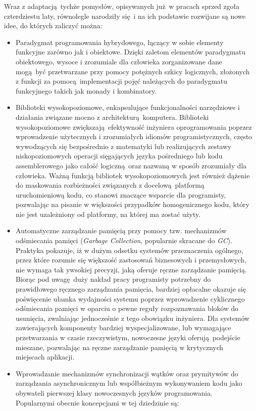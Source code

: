 \par{
Wraz z adaptacją tychże pomysłów, opisywanych już w pracach sprzed zgoła czterdziestu laty, równolegle narodziły się i na ich podstawie rozwijane są nowe idee, do których zaliczyć można:
\begin{itemize}
  \item Paradygmat programowania hybrydowego, łączący w sobie elementy funkcyjne zarówno jak i obiektowe. Dzięki zaletom elementów paradygmatu obiektowego, wysoce i zrozumiale dla człowieka zorganizowane dane mogą być przetwarzane przy pomocy potężnych szkicy logicznych, złożonych z funkcji za pomocą implementacji pojęć należących do paradygmatu funkcyjnego takich jak monady i kombinatory.
  \item Biblioteki wysokopoziomowe, enkapsulujące funkcjonalności narzędziowe i działania związane mocno z architekturą komputera. Biblioteki wysokopoziomowe zwiększają efektywność inżyniera oprogramowania poprzez wprowadzenie użytecznych i zrozumiałych idiomów programistycznych, często wywodzących się bezpośrednio z matematyki lub realizujących zestawy niskopoziomowych operacji sięgających języka pośredniego lub kodu assemblerowego jako całość logiczną oraz nazwaną w sposób zrozumiały dla człowieka. Ważną funkcją bibliotek wysokopoziomowych jest również dążenie do maskowania rozbieżności związanych z docelową platformą uruchomieniową kodu, co stanowi znaczące wsparcie dla programisty, pozwalając na pisanie w większości przypadków homogenicznego kodu, który nie jest uzależniony od platformy, na której ma zostać użyty.
  \item Automatyczne zarządzanie pamięcią przy pomocy tzw. mechanizmów odśmiecania pamięci (\emph{Garbage Collection}, popularnie skracane do \emph{GC}). Praktyka pokazuje, iż w dużym odsetku systemów przeznaczenia ogólnego, przez które rozumie się większość zastosowań biznesowych i przemysłowych, nie wymaga tak ywsokiej precyzji, jaką oferuje ręczne zarządzanie pamięcią. Biorąc pod uwagę duży nakład pracy programisty potrzebny do prawidłowego ręcznego zarządzania pamięcia, bardziej opłacalne okazuje się poświęcenie ułamka wydajności systemu poprzez wprowadzenie cyklicznego odśmiecania pamięci w oparciu o pewne reguły rozpoznawania bloków do usunięcia, zwalniając jednocześnie z tego obowiązku inżyniera. Dla systemów zawierających komponenty bardziej wyspecjalizowane, lub wymagające przetwarzania w czasie rzeczywistym, nowoczesne języki oferują podejście mieszane, pozwalając na ręczne zarządzanie pamięcią w krytycznych miejscach aplikacji.
  \item Wprowadzanie mechanizmów synchronizacji wątków oraz prymitywów do zarządzania asynchronicznym lub współbieżnym wykonywaniem kodu jako obywateli pierwszej klasy nowoczesnych języków programowania. Popularnymi obecnie koncepcjami w tej dziedzinie są:

\end{itemize}}
